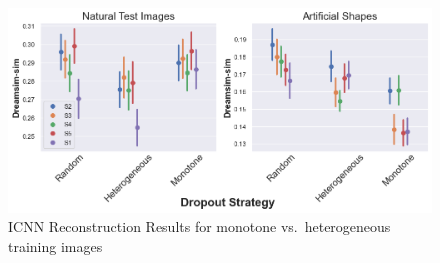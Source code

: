 \begin{figure}[ht]
  \centering
  \includegraphics[width=1\textwidth]{plots/dropout_discussion_reconstruction_icnn.png}
  \caption{ICNN Reconstruction Results for monotone vs.\ heterogeneous training images}\label{fig:dropout_discussion_reconstruction_icnn}
\end{figure}


